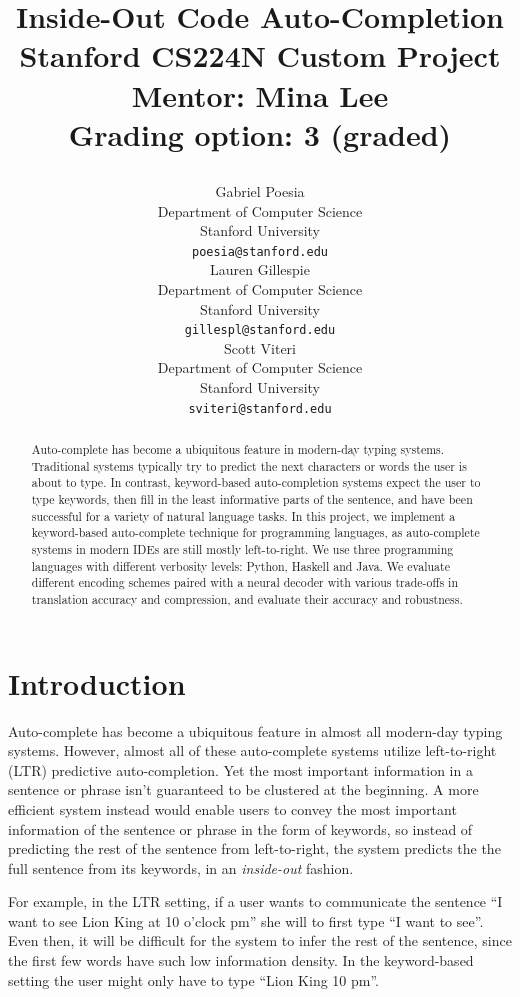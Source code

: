 \documentclass{article}
\title{
  Inside-Out Code Auto-Completion \\
  \vspace{1em}
  \small{\normalfont Stanford CS224N Custom Project}  %
  \\
  \small{\normalfont Mentor: Mina Lee}  %
  \\
  \small{\normalfont Grading option: 3 (graded)}  %

}
\author{
  Gabriel Poesia \\
  Department of Computer Science \\
  Stanford University \\
  \texttt{poesia@stanford.edu} \\
  \And
  Lauren Gillespie \\
  Department of Computer Science \\
  Stanford University \\
  \texttt{gillespl@stanford.edu} \\
  \And
  Scott Viteri \\
  Department of Computer Science \\
  Stanford University \\
  \texttt{sviteri@stanford.edu}

}
\begin{document}
\maketitle

\begin{abstract}
  Auto-complete has become a ubiquitous feature in modern-day typing systems. Traditional systems typically try to predict the next characters or words the user is about to type. In contrast, keyword-based auto-completion systems expect the user to type keywords,
   then fill in the least informative parts of the sentence, and have been successful
  for a variety of natural language tasks. In this project, we implement a keyword-based auto-complete technique for programming languages,
  as auto-complete systems in modern IDEs are still mostly left-to-right. We use three programming
  languages with different verbosity levels: Python, Haskell and Java. We evaluate different encoding schemes paired
  with a neural decoder with various trade-offs in translation accuracy and compression, and evaluate their accuracy and robustness.

\end{abstract}


\section{Introduction}
Auto-complete has become a ubiquitous feature in almost all modern-day typing systems. However, almost all of these auto-complete systems utilize left-to-right (LTR) predictive auto-completion. Yet the most important information in a sentence or phrase isn't guaranteed to be clustered at the beginning. A more efficient system instead would enable users to convey the most important information of the sentence or phrase in the form of keywords, so instead of predicting the rest of the sentence from left-to-right, the system predicts the the full sentence from its keywords, in an \textit{inside-out} fashion.

For example, in the LTR setting, if a user wants to communicate the sentence ``I want to see Lion King at 10 o'clock pm'' she will to first type ``I want to see''. Even then, it will be difficult for the system to infer the rest of the sentence, since the first few words have such low information density. In the keyword-based setting the user might only have to type ``Lion King 10 pm''.
\end{document}
